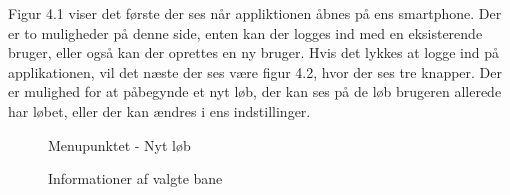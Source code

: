 Figur 4.1 viser det første der ses når appliktionen åbnes på ens smartphone. Der er to muligheder på denne side, enten kan der logges ind med en eksisterende bruger, eller også kan der oprettes en ny bruger. 
Hvis det lykkes at logge ind på applikationen, vil det næste der ses være figur 4.2, hvor der ses tre knapper. Der er mulighed for at påbegynde et nyt løb, der kan ses på de løb brugeren allerede har løbet, eller der kan ændres i ens indstillinger.

\begin{figure}
	\centering
	\begin{minipage}{.5\textwidth}
		\centering
		\caption{Menupunktet - Nyt løb}
		\label{fig:test1}
	\end{minipage}%
	\begin{minipage}{.5\textwidth}
		\centering
		\caption{Informationer af valgte bane}
		\label{fig:test2}
	\end{minipage}
\end{figure}

